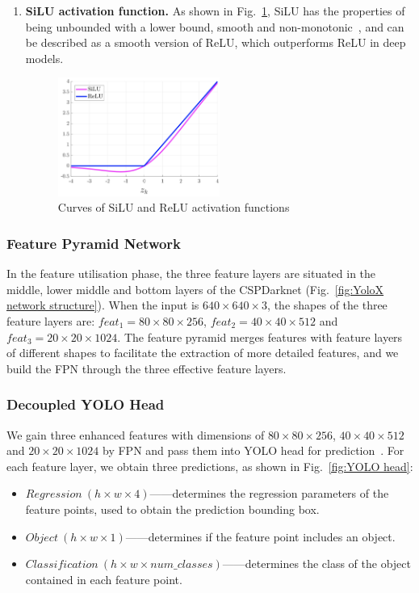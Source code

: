 \begin{enumerate}
    \item \textbf{SiLU activation function.} As shown in Fig.~\ref{fig:SiLU}, SiLU has the properties of being unbounded with a lower bound, smooth and non-monotonic~\citep{Elfwing2018}, and can be described as a smooth version of ReLU, which outperforms ReLU in deep models.
    
        \begin{figure}[htb]
            \centering
            \includegraphics[width=0.5\textwidth]{images/SiLU.png}
            \caption{Curves of SiLU and ReLU activation functions~\citep{Elfwing2018}}
            \label{fig:SiLU}
        \end{figure}
    
\end{enumerate}


\subsubsection{Feature Pyramid Network}
In the feature utilisation phase, the three feature layers are situated in the middle, lower middle and bottom layers of the CSPDarknet (Fig.~\ref{fig:YoloX network structure}). When the input is $640\times 640\times 3$, the shapes of the three feature layers are: $feat_1 = 80\times 80\times 256$, $feat_2 = 40\times 40\times 512$ and $feat_3 = 20\times 20\times 1024$. The feature pyramid merges features with feature layers of different shapes to facilitate the extraction of more detailed features, and we build the FPN through the three effective feature layers.


\subsubsection{Decoupled YOLO Head}
We gain three enhanced features with dimensions of $80\times 80\times 256$, $40\times 40\times 512$ and $20\times 20\times 1024$ by FPN and pass them into YOLO head for prediction~\citep{Elfwing2018}. For each feature layer, we obtain three predictions, as shown in Fig.~\ref{fig:YOLO head}:
\begin{itemize}
    \item $Regression\ (h\times w\times 4)$——determines the regression parameters of the feature points, used to obtain the prediction bounding box.
    \item $Object\ (h\times w\times 1)$——determines if the feature point includes an object.
    \item $Classification\ (h\times w\times num\_classes)$——determines the class of the object contained in each feature point.
\end{itemize}

